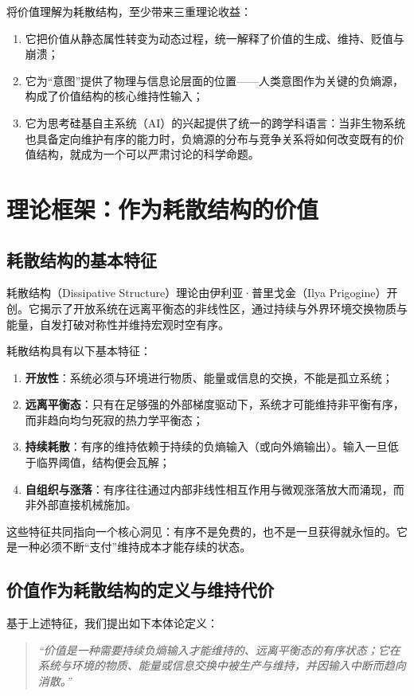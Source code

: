 \documentclass[11pt,a4paper]{ctexart}
\begin{document}
将价值理解为耗散结构，至少带来三重理论收益：
\begin{enumerate}
    \item 它把价值从静态属性转变为动态过程，统一解释了价值的生成、维持、贬值与崩溃；
    \item 它为“意图”提供了物理与信息论层面的位置——人类意图作为关键的负熵源，构成了价值结构的核心维持性输入；
    \item 它为思考硅基自主系统（AI）的兴起提供了统一的跨学科语言：当非生物系统也具备定向维护有序的能力时，负熵源的分布与竞争关系将如何改变既有的价值结构，就成为一个可以严肃讨论的科学命题。
\end{enumerate}

\section{理论框架：作为耗散结构的价值}

\subsection{耗散结构的基本特征}
耗散结构（Dissipative Structure）理论由伊利亚·普里戈金（Ilya Prigogine）开创\cite{prigogine1977self, prigogine1978time, prigogine1984order}。它揭示了开放系统在远离平衡态的非线性区，通过持续与外界环境交换物质与能量，自发打破对称性并维持宏观时空有序。

耗散结构具有以下基本特征：
\begin{enumerate}
    \item \textbf{开放性}：系统必须与环境进行物质、能量或信息的交换，不能是孤立系统；
    \item \textbf{远离平衡态}：只有在足够强的外部梯度驱动下，系统才可能维持非平衡有序，而非趋向均匀死寂的热力学平衡态；
    \item \textbf{持续耗散}：有序的维持依赖于持续的负熵输入（或向外熵输出）。输入一旦低于临界阈值，结构便会瓦解；
    \item \textbf{自组织与涨落}：有序往往通过内部非线性相互作用与微观涨落放大而涌现，而非外部直接机械施加。
\end{enumerate}

这些特征共同指向一个核心洞见：有序不是免费的，也不是一旦获得就永恒的。它是一种必须不断“支付”维持成本才能存续的状态。

\subsection{价值作为耗散结构的定义与维持代价}
基于上述特征，我们提出如下本体论定义：
\begin{quote}
\textit{“价值是一种需要持续负熵输入才能维持的、远离平衡态的有序状态；它在系统与环境的物质、能量或信息交换中被生产与维持，并因输入中断而趋向消散。”}
\end{quote}
\end{document}
